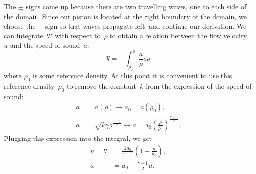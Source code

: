 \documentclass[../../thesis.tex]{subfiles}
\begin{document}
The $\pm$ signs come up because there are two travelling waves, one to each side of the domain.
Since our piston is located at the right boundary of the domain, 
we choose the $-$ sign so that waves propagate left, and continue our derivation.
We can integrate~$\mathtt{V}'$ with respect to~$\rho$ to obtain a relation between the flow velocity~$u$ and the speed of sound~$a$:
\begin{equation}
    \mathtt{V} = - \int_{\rho_0}^{\rho} \frac{a}{\rho} d\rho 
\end{equation}
where $\rho_0$ is some reference density.
At this point it is convenient to use this reference density~$\rho_0$ to remove the constant~$k$ from the expression of the speed of sound:
\begin{subequations}
    \begin{align}
        a &= a(\rho) 
        \rightarrow 
        a_0 = a(\rho_0),
        \\
        a &= \sqrt{k \gamma} \rho^{\frac{\gamma-1}{2}} 
        \rightarrow
        a = a_0 \left(\frac{\rho}{\rho_0}\right)^{\frac{\gamma-1}{2}}.
    \end{align}    
\end{subequations}
Plugging this expression into the integral, we get
\begin{subequations}
    \begin{align}
        u = \mathtt{V} &= \frac{2a_0}{\gamma-1}\left(1 - \frac{a}{a_0}\right),
        \\[2mm]
        a &= a_0 - \frac{\gamma-1}{2}u. \label{eq:speed_of_sound_with_velocity}
    \end{align}
\end{subequations}
\end{document}
